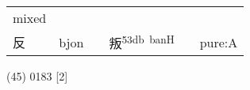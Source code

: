 \documentclass[14pt,a4paper]{scrartcl}
\begin{document}
\begin{longtable}[c]{@{}llllll@{}}
\begin{minipage}[t]{0.14\columnwidth}
mixed
\strut\end{minipage}\tabularnewline
\begin{minipage}[t]{0.14\columnwidth}\raggedright\strut
反
\strut\end{minipage} &
\begin{minipage}[t]{0.14\columnwidth}\raggedright\strut
bjon
\strut\end{minipage} &
\begin{minipage}[t]{0.14\columnwidth}\raggedright\strut
\strut\end{minipage} &
\begin{minipage}[t]{0.14\columnwidth}\raggedright\strut
叛\textsuperscript{53db~banH}
\strut\end{minipage} &
\begin{minipage}[t]{0.14\columnwidth}\raggedright\strut
\strut\end{minipage} &
\begin{minipage}[t]{0.14\columnwidth}\raggedright\strut
pure:A
\strut\end{minipage}\tabularnewline
\bottomrule
\end{longtable}

(45) 0183 {[}2{]}
\end{document}

